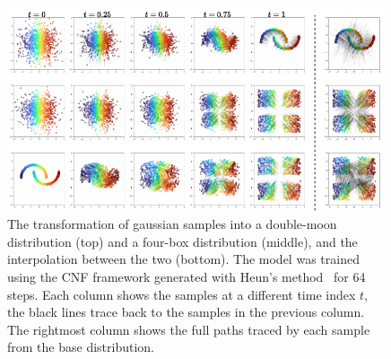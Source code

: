 {
\renewcommand{\arraystretch}{1.5}
\begin{table}[h!]
    \centering
    \caption{Hyperparameters used in the different diffusion frameworks.}
    \label{tab:diffusion_frameworks}
\end{table}
}

\begin{figure}[ht]
    \centering
    \includegraphics[width=0.99\textwidth]{Figures/generative_models/cm_samples.pdf}
    \caption{The transformation of gaussian samples into a double-moon distribution (top) and a four-box distribution (middle), and the interpolation between the two (bottom). The model was trained using the CNF framework generated with Heun's method~\cite{heun} for 64 steps. Each column shows the samples at a different time index $t$, the black lines trace back to the samples in the previous column. The rightmost column shows the full paths traced by each sample from the base distribution.}
    \label{fig:cm_samples}
\end{figure}


